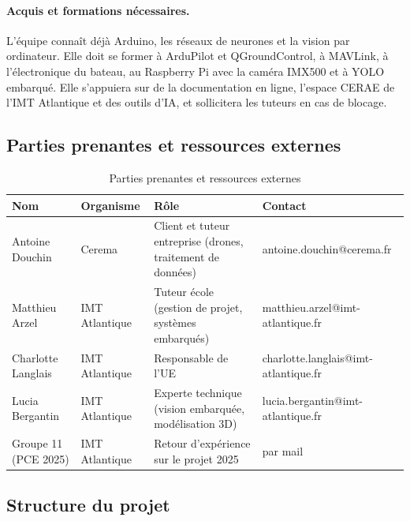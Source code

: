 \paragraph{Acquis et formations nécessaires.}
L'équipe connaît déjà Arduino, les réseaux de neurones et la vision par ordinateur. Elle doit se former à ArduPilot et QGroundControl, à MAVLink, à l'électronique du bateau, au Raspberry Pi avec la caméra IMX500 et à YOLO embarqué. Elle s'appuiera sur de la documentation en ligne, l'espace CERAE de l'IMT Atlantique et des outils d'IA, et sollicitera les tuteurs en cas de blocage.
\\
\subsection{Parties prenantes et ressources externes}

\begin{table}[H]
\centering
\small
\caption{Parties prenantes et ressources externes}
\label{tab:parties-prenantes}
\begin{tabularx}{\textwidth}{@{}p{2.7cm}p{2.3cm}Lp{5.2cm}@{}}
\toprule
\textbf{Nom} & \textbf{Organisme} & \textbf{Rôle} & \textbf{Contact} \\
\midrule
Antoine Douchin & Cerema & Client et tuteur entreprise (drones, traitement de données) & antoine.douchin@cerema.fr \\
Matthieu Arzel & IMT Atlantique & Tuteur école (gestion de projet, systèmes embarqués) & matthieu.arzel@imt-atlantique.fr \\
Charlotte Langlais & IMT Atlantique & Responsable de l'UE & charlotte.langlais@imt-atlantique.fr \\
Lucia Bergantin & IMT Atlantique & Experte technique (vision embarquée, modélisation 3D) & lucia.bergantin@imt-atlantique.fr \\
Groupe 11 (PCE 2025) & IMT Atlantique & Retour d'expérience sur le projet 2025 & par mail \\
\bottomrule
\end{tabularx}
\end{table}

\subsection{Structure du projet}
\label{sec:structure}


